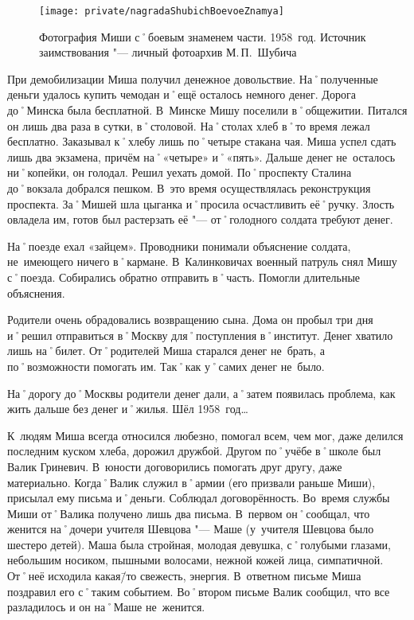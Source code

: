 \begin{figure}[h]
\texttt{[image: private/nagradaShubichBoevoeZnamya]}
\caption{Фотография Миши с˚боевым знаменем части. 1958~год. Источник заимствования "--- личный фотоархив М.\,П.~Шубича}
\label{fig:nagradaShubichBoevoeZnamya}
\end{figure}

При демобилизации Миша получил денежное довольствие. На˚полученные деньги удалось купить чемодан и˚ещё осталось немного денег. Дорога до˚Минска была бесплатной. В~Минске Мишу поселили в˚общежитии. Питался он лишь два раза в сутки, в˚столовой. На˚столах хлеб в˚то время лежал бесплатно. Заказывал к˚хлебу лишь по˚четыре стакана чая. Миша успел сдать лишь два экзамена, причём на˚«четыре» и˚«пять». Дальше денег не~осталось ни˚копейки, он голодал. Решил уехать домой. По˚проспекту Сталина до˚вокзала добрался пешком. В~это время осуществлялась реконструкция проспекта. За˚Мишей шла цыганка и˚просила осчастливить её˚ручку. Злость овладела им, готов был растерзать её "--- от˚голодного солдата требуют денег.

На˚поезде ехал «зайцем». Проводники понимали объяснение солдата, не~имеющего ничего в˚кармане. В~Калинковичах военный патруль снял Мишу с˚поезда. Собирались обратно отправить в˚часть. Помогли длительные объяснения.

Родители очень обрадовались возвращению сына. Дома он пробыл три дня и˚решил отправиться в˚Москву для˚поступления в˚институт. Денег хватило лишь на˚билет. От˚родителей Миша старался денег не~брать, а по˚возможности помогать им. Так˚как у˚самих денег не~было.

На˚дорогу до˚Москвы родители денег дали, а˚затем появилась проблема, как жить дальше без денег и˚жилья. Шёл 1958~год…

К~людям Миша всегда относился любезно, помогал всем, чем мог, даже делился последним куском хлеба, дорожил дружбой. Другом по˚учёбе в˚школе был Валик Гриневич. В~юности договорились помогать друг другу, даже материально. Когда˚Валик служил в˚армии (его призвали раньше Миши), присылал ему письма и˚деньги. Соблюдал договорённость. Во~время службы Миши от˚Валика получено лишь два письма. В~первом он˚сообщал, что женится на˚дочери учителя Шевцова "--- Маше (у~учителя Шевцова было шестеро детей). Маша была стройная, молодая девушка, с˚голубыми глазами, небольшим носиком, пышными волосами, нежной кожей лица, симпатичной. От˚неё исходила какая\=/то свежесть, энергия. В~ответном письме Миша поздравил его с˚таким событием. Во˚втором письме Валик сообщил, что все разладилось и он на˚Маше не~женится.

